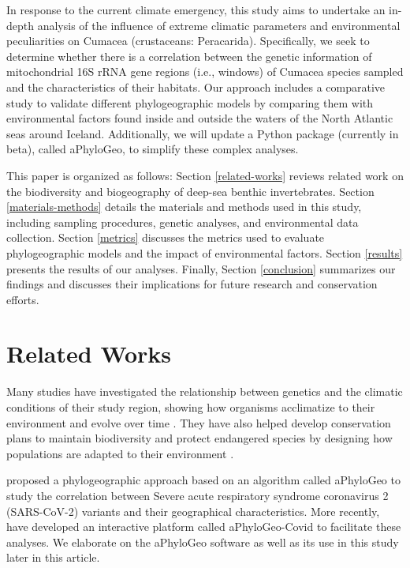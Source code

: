 In response to the current climate emergency, this study aims to undertake an in-depth analysis of the influence of extreme climatic parameters and environmental peculiarities on Cumacea (crustaceans: Peracarida). Specifically, we seek to determine whether there is a correlation between the genetic information of mitochondrial 16S rRNA gene regions (i.e., windows) of Cumacea species sampled and the characteristics of their habitats. Our approach includes a comparative study to validate different phylogeographic models by comparing them with environmental factors found inside and outside the waters of the North Atlantic seas around Iceland. Additionally, we will update a Python package (currently in beta), called aPhyloGeo, to simplify these complex analyses.

This paper is organized as follows: Section \autoref{related-works} reviews related work on the biodiversity and biogeography of deep-sea benthic invertebrates. Section \autoref{materials-methods} details the materials and methods used in this study, including sampling procedures, genetic analyses, and environmental data collection. Section \autoref{metrics} discusses the metrics used to evaluate phylogeographic models and the impact of environmental factors. Section \autoref{results} presents the results of our analyses. Finally, Section \autoref{conclusion} summarizes our findings and discusses their implications for future research and conservation efforts.

\section{Related Works}\label{related-works}
Many studies have investigated the relationship between genetics and the climatic conditions of their study region, showing how organisms acclimatize to their environment and evolve over time \citep{fc_genomic_2012}. They have also helped develop conservation plans to maintain biodiversity and protect endangered species by designing how populations are adapted to their environment \citep{balkenhol_identifying_2009}.

\cite{koshkarov_phylogeography_2022} proposed a phylogeographic approach based on an algorithm called aPhyloGeo to study the correlation between Severe acute respiratory syndrome coronavirus 2 (SARS-CoV-2) variants and their geographical characteristics. More recently, \cite{li_aphylogeo-covid_2023} have developed an interactive platform called aPhyloGeo-Covid to facilitate these analyses.  We elaborate on the aPhyloGeo software as well as its use in this study later in this article.

